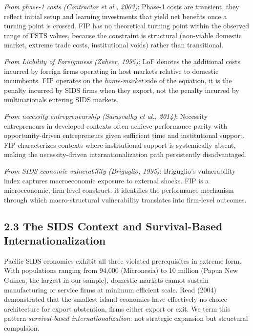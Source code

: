 \documentclass[
  12pt]{article}
\begin{document}
\emph{From phase-1 costs (Contractor et al., 2003)}: Phase-1 costs are
transient, they reflect initial setup and learning investments that
yield net benefits once a turning point is crossed. FIP has no
theoretical turning point within the observed range of FSTS values,
because the constraint is structural (non-viable domestic market,
extreme trade costs, institutional voids) rather than transitional.

\emph{From Liability of Foreignness (Zaheer, 1995)}: LoF denotes the
additional costs incurred by foreign firms operating in host markets
relative to domestic incumbents. FIP operates on the \emph{home-market}
side of the equation, it is the penalty incurred by SIDS firms when they
export, not the penalty incurred by multinationals entering SIDS
markets.

\emph{From necessity entrepreneurship (Sarasvathy et al., 2014)}:
Necessity entrepreneurs in developed contexts often achieve performance
parity with opportunity-driven entrepreneurs given sufficient time and
institutional support. FIP characterizes contexts where institutional
support is systemically absent, making the necessity-driven
internationalization path persistently disadvantaged.

\emph{From SIDS economic vulnerability (Briguglio, 1995)}: Briguglio's
vulnerability index captures macroeconomic exposure to external shocks.
FIP is a microeconomic, firm-level construct: it identifies the
performance mechanism through which macro-structural vulnerability
translates into firm-level outcomes.

\hypertarget{the-sids-context-and-survival-based-internationalization}{%
\subsection{2.3 The SIDS Context and Survival-Based
Internationalization}\label{the-sids-context-and-survival-based-internationalization}}

Pacific SIDS economies exhibit all three violated prerequisites in
extreme form. With populations ranging from 94,000 (Micronesia) to 10
million (Papua New Guinea, the largest in our sample), domestic markets
cannot sustain manufacturing or service firms at minimum efficient
scale. Read (2004) demonstrated that the smallest island economies have
effectively no choice architecture for export abstention, firms either
export or exit. We term this pattern \emph{survival-based
internationalization}: not strategic expansion but structural
compulsion.
\end{document}
